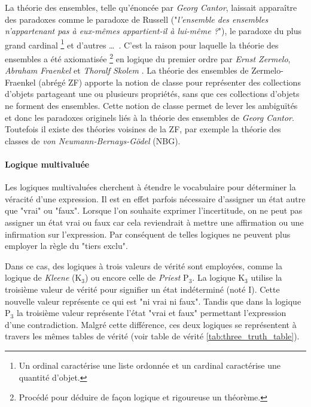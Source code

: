 \begin{refsegment}
\begin{shadedfigure}[H]
    \end{shadedfigure}

    La théorie des ensembles, telle qu'énoncée par \textit{Georg Cantor}, laissait apparaître des paradoxes comme le paradoxe de Russell ("\textit{l'ensemble des ensembles n'appartenant pas à eux-mêmes appartient-il à lui-même ?}"), le paradoxe du plus grand cardinal \footnote{Un ordinal caractérise une liste ordonnée et un cardinal caractérise une quantité d'objet.} et d'autres \ldots~. C'est la raison pour laquelle la théorie des ensembles a été axiomatisée \footnote{Procédé pour déduire de façon logique et rigoureuse un théorème.} en logique du premier ordre par \textit{Ernst Zermelo}, \textit{ Abraham Fraenkel} et \textit{Thoralf Skolem} \cite{hayden1968zermelo,kanamori2008higher}. La théorie des ensembles de Zermelo-Fraenkel (abrégé ZF) apporte la notion de classe pour représenter des collections d'objets partageant une ou plusieurs propriétés, sans que ces collections d'objets ne forment des ensembles. Cette notion de classe permet de lever les ambiguïtés et donc les paradoxes originels liés à la théorie des ensembles de \textit{Georg Cantor}. Toutefois il existe des théories voisines de la ZF, par exemple la théorie des classes \cite{bernays1937system,van1967frege} de \textit{von Neumann-Bernays-Gödel} (NBG).

        
    \paragraph{Logique multivaluée}\label{par:logic_multivalued}
    
    Les logiques multivaluées cherchent à étendre le vocabulaire pour déterminer la véracité d'une expression.  Il est en effet parfois nécessaire d'assigner un état autre que "vrai" ou "faux". Lorsque l'on souhaite exprimer l'incertitude, on ne peut pas assigner un état vrai ou faux car cela reviendrait à mettre une affirmation ou une infirmation sur l'expression. Par conséquent de telles logiques ne peuvent plus employer la règle du "tiers exclu".
    
    Dans ce cas, des logiques à trois valeurs de vérité sont employées, comme la logique de \textit{Kleene} (K$_{3}$) ou encore celle de \textit{Priest} P$_{3}$. La logique K$_{3}$ utilise la troisième valeur de vérité pour signifier un état indéterminé (noté I).  Cette nouvelle valeur représente ce qui est "ni vrai ni faux".  Tandis que dans la logique P$_{3}$ la troisième valeur représente l'état "vrai et faux" permettant l'expression d'une contradiction. Malgré cette différence, ces deux logiques se représentent à travers les mêmes tables de vérité (voir table de vérité \ref{tab:three_truth_table}).
    

\end{refsegment}
